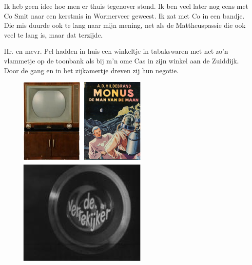 \documentclass[12pt,twoside, openright]{memoir}
\begin{document}
Ik heb geen idee hoe men er thuis tegenover stond. Ik ben veel later nog eens met Co Smit naar een kerstmis in Wormerveer geweest. Ik zat met Co in een bandje. Die mis duurde ook te lang naar mijn mening, net als de Mattheuspassie die ook veel te lang is, maar dat terzijde.

Hr. en mevr. Pel hadden in huis een winkeltje in tabakswaren met net zo'n vlammetje op de toonbank als bij m'n ome Cas in zijn winkel aan de Zuiddijk. Door de gang en in het zijkamertje dreven zij hun negotie. 

\begin{figure}
\includegraphics[width=\textwidth]{img/ch5/1950s}
\caption*{\footnotesize }
\end{figure} 
\end{document}
